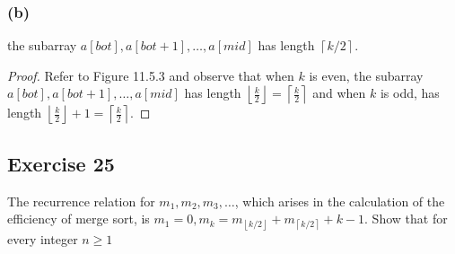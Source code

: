\documentclass[14pt]{extarticle}
\newcommand{\floor}[1]{{\left\lfloor#1\right\rfloor}}
\newcommand{\ceil}[1]{{\left\lceil#1\right\rceil}}
\begin{document}
\subsubsection{(b)}
the subarray \(a[bot], a[bot + 1], \ldots, a[mid]\) has length \(\ceil{k/2}\).

\begin{proof}
    Refer to Figure 11.5.3 and observe that when \(k\) is even, the subarray \(a[bot], a[bot + 1], \ldots, a[mid]\) has length
    \(\floor{\frac{k}{2}} = \ceil{\frac{k}{2}}\) and when \(k\) is odd, has length \(\floor{\frac{k}{2}}+1=\ceil{\frac{k}{2}}\).
\end{proof}

\subsection{Exercise 25}
The recurrence relation for \(m_1, m_2, m_3, \ldots\), which arises in the calculation of the efficiency of merge sort, is
\(m_1 = 0, m_k = m_{\floor{k/2}} + m_{\ceil{k/2}} + k - 1\). Show that for every integer \(n \geq 1\)
\end{document}

